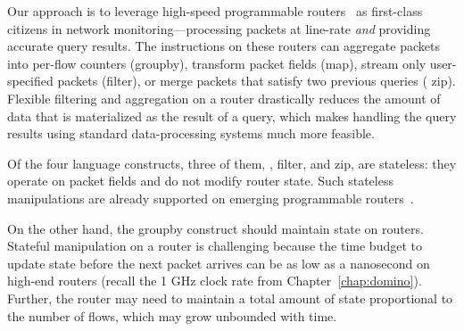 Our approach is to leverage high-speed programmable routers~\cite{rmt, xpliant,
  tofino, flexpipe} as first-class citizens in network monitoring---processing
packets at line-rate {\em and} providing accurate query results.
The instructions on these routers can aggregate packets into per-flow counters
({\ct groupby}), transform packet fields ({\ct map}), stream only user-specified
packets ({\ct filter}), or merge packets that satisfy two previous queries ({\ct
  zip}). Flexible filtering and aggregation on a router drastically reduces the
amount of data that is materialized as the result of a query, which makes
handling the query results using standard data-processing systems much more
feasible.

Of the four language constructs, three of them, , {\ct filter}, and
{\ct zip}, are stateless: they operate on packet fields and do not modify router
state. Such stateless manipulations are already supported on emerging
programmable routers~\cite{rmt, xpliant, flexpipe, tofino}.

On the other hand, the {\ct groupby} construct should maintain state on routers.
Stateful manipulation on a router is challenging because the time budget to
update state before the next packet arrives can be as low as a nanosecond on
high-end routers (recall the 1 GHz clock rate from Chapter~\ref{chap:domino}).
Further, the router may need to maintain a total amount of state proportional
to the number of flows, which may grow unbounded with time.

